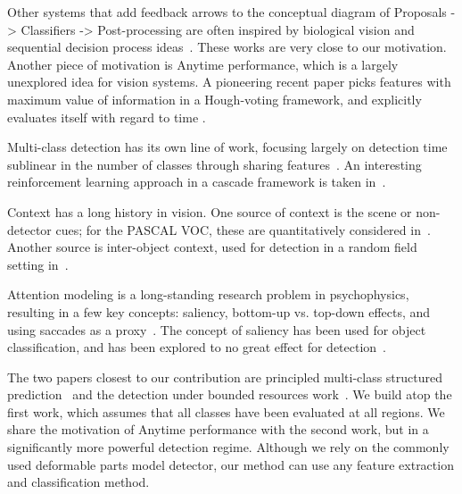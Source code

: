 Other systems that add feedback arrows to the conceptual diagram of Proposals -> Classifiers -> Post-processing are often inspired by biological vision and sequential decision process ideas~\cite{Butko2009,Vogel2008,Paletta2005}.
These works are very close to our motivation.
Another piece of motivation is Anytime performance, which is a largely unexplored idea for vision systems.
A pioneering recent paper picks features with maximum value of information in a Hough-voting framework, and explicitly evaluates itself with regard to time \cite{Vijayanarasimhan2010}.

Multi-class detection has its own line of work, focusing largely on detection time sublinear in the number of classes through sharing features~\cite{Torralba2007,Fan2005,Razavi2011}.
An interesting reinforcement learning approach in a cascade framework is taken in~\cite{Isukapalli2006}.

Context has a long history in vision.
One source of context is the scene or non-detector cues; for the PASCAL VOC, these are quantitatively considered in~\cite{Divvala2009}.
Another source is inter-object context, used for detection in a random field setting in~\cite{Torralba2004}.

Attention modeling is a long-standing research problem in psychophysics, resulting in a few key concepts: saliency, bottom-up vs. top-down effects, and using saccades as a proxy~\cite{Itti2001a,Chikkerur2010,Judd2009}.
The concept of saliency has been used for object classification, and has been explored to no great effect for detection~\cite{Kanan2010}.

The two papers closest to our contribution are principled multi-class structured prediction~\cite{Desai2009} and the detection under bounded resources work~\cite{Vijayanarasimhan2010}.
We build atop the first work, which assumes that all classes have been evaluated at all regions.
We share the motivation of Anytime performance with the second work, but in a significantly more powerful detection regime.
Although we rely on the commonly used deformable parts model detector, our method can use any feature extraction and classification method.
